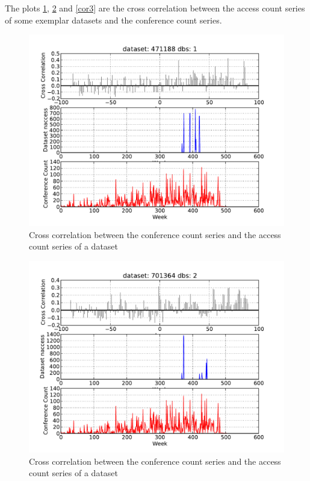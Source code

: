 \documentclass[preprint, 12pt]{elsarticle}
\begin{document}
The plots \ref{cor1}, \ref{cor2} and \ref{cor3} are the cross correlation between the access count series of some exemplar datasets and the conference count series.

\begin{figure}
\begin{center}
\includegraphics[scale=0.5]{../data/timeseries/datasets/471188_1_365.pdf}
\end{center}
\caption{Cross correlation between the conference count series and the access count series of a dataset}
\label{cor1}
\end{figure}

\begin{figure}
\begin{center}   
\includegraphics[scale=0.5]{../data/timeseries/datasets/701364_2_364.pdf}
\end{center}
\caption{Cross correlation between the conference count series and the access count series of a dataset}
\label{cor2}
\end{figure}
\end{document}
